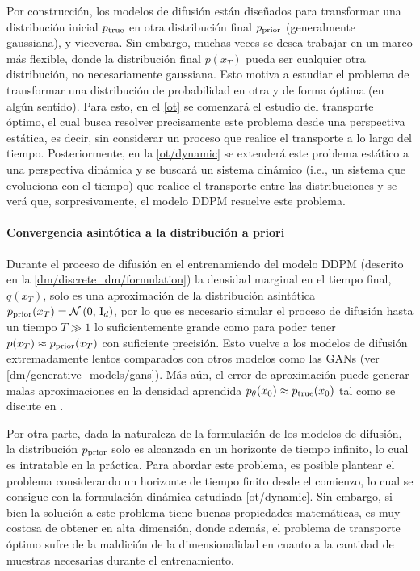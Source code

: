 Por construcción, los modelos de difusión están diseñados para transformar una distribución inicial $p_{\operatorname{true}}$ en otra distribución final $p_{\operatorname{prior}}$ (generalmente gaussiana), y viceversa. Sin embargo, muchas veces se desea trabajar en un marco más flexible, donde la distribución final $p(x_T)$ pueda ser cualquier otra distribución, no necesariamente gaussiana. Esto motiva a estudiar el problema de transformar una distribución de probabilidad en otra y de forma óptima (en algún sentido). Para esto, en el \autoref{ot} se comenzará el estudio del transporte óptimo, el cual busca resolver precisamente este problema desde una perspectiva estática, es decir, sin considerar un proceso que realice el transporte a lo largo del tiempo. Posteriormente, en la \autoref{ot/dynamic} se extenderá este problema estático a una perspectiva dinámica y se buscará un sistema dinámico (i.e., un sistema que evoluciona con el tiempo) que realice el transporte entre las distribuciones y se verá que, sorpresivamente, el modelo DDPM resuelve este problema.

\paragraph{Convergencia asintótica a la distribución a priori}

Durante el proceso de difusión en el entrenamiendo del modelo DDPM (descrito en la \autoref{dm/discrete_dm/formulation}) la densidad marginal en el tiempo final, $q(x_T)$, solo es una aproximación de la distribución asintótica $p_{\operatorname{prior}}(x_T)=\mathcal{N}\left(0,\,\operatorname{I}_{d}\right)$, por lo que es necesario simular el proceso de difusión hasta un tiempo $T\gg1$ lo suficientemente grande como para poder tener $p(x_T)\approx p_{\operatorname{prior}}(x_T)$ con suficiente precisión. Esto vuelve a los modelos de difusión extremadamente lentos comparados con otros modelos como las GANs (ver \autoref{dm/generative_models/gans}). Más aún, el error de aproximación puede generar malas aproximaciones en la densidad aprendida $p_\theta(x_0)\approx p_{\operatorname{true}}(x_0)$ tal como se discute en \cite{debortoli2023diffusion}.

Por otra parte, dada la naturaleza de la formulación de los modelos de difusión, la distribución $p_{\operatorname{prior}}$ solo es alcanzada en un horizonte de tiempo infinito, lo cual es intratable en la práctica. Para abordar este problema, es posible plantear el problema considerando un horizonte de tiempo finito desde el comienzo, lo cual se consigue con la formulación dinámica estudiada \autoref{ot/dynamic}. Sin embargo, si bien la solución a este problema tiene buenas propiedades matemáticas, es muy costosa de obtener en alta dimensión, donde además, el problema de transporte óptimo sufre de la maldición de la dimensionalidad en cuanto a la cantidad de muestras necesarias durante el entrenamiento.

